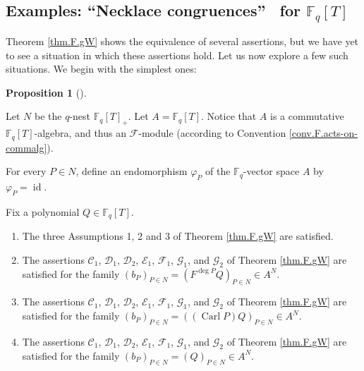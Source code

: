 \documentclass[numbers=enddot,12pt,final,onecolumn,notitlepage]{scrartcl}%
\theoremstyle{definition}
\newtheorem{prop}[theo]{Proposition}
\newenvironment{proposition}[1][]
{\begin{prop}[#1]\begin{leftbar}}
{\end{leftbar}\end{prop}}
\begin{document}
\subsection{Examples: \textquotedblleft Necklace congruences\textquotedblright%
\ for $\mathbb{F}_{q}\left[  T\right]  $}

Theorem \ref{thm.F.gW} shows the equivalence of several assertions, but we
have yet to see a situation in which these assertions hold. Let us now explore
a few such situations. We begin with the simplest ones:

\begin{proposition}
\label{prop.F.gW.example1}Let $N$ be the $q$-nest $\mathbb{F}_{q}\left[
T\right]  _{+}$. Let $A=\mathbb{F}_{q}\left[  T\right]  $. Notice that $A$ is
a commutative $\mathbb{F}_{q}\left[  T\right]  $-algebra, and thus an
$\mathcal{F}$-module (according to Convention \ref{conv.F.acts-on-commalg}).

For every $P\in N$, define an endomorphism $\varphi_{P}$ of the $\mathbb{F}%
_{q}$-vector space $A$ by $\varphi_{P}=\operatorname*{id}$.

Fix a polynomial $Q\in\mathbb{F}_{q}\left[  T\right]  $.

\begin{enumerate}
\item[\textbf{(a)}] The three Assumptions 1, 2 and 3 of Theorem \ref{thm.F.gW}
are satisfied.

\item[\textbf{(b)}] The assertions $\mathcal{C}_{1}$, $\mathcal{D}_{1}$,
$\mathcal{D}_{2}$, $\mathcal{E}_{1}$, $\mathcal{F}_{1}$, $\mathcal{G}_{1}$,
and $\mathcal{G}_{2}$ of Theorem \ref{thm.F.gW} are satisfied for the family
$\left(  b_{P}\right)  _{P\in N}=\left(  F^{\deg P}Q\right)  _{P\in N}\in
A^{N}$.

\item[\textbf{(c)}] The assertions $\mathcal{C}_{1}$, $\mathcal{D}_{1}$,
$\mathcal{D}_{2}$, $\mathcal{E}_{1}$, $\mathcal{F}_{1}$, $\mathcal{G}_{1}$,
and $\mathcal{G}_{2}$ of Theorem \ref{thm.F.gW} are satisfied for the family
$\left(  b_{P}\right)  _{P\in N}=\left(  \left(  \operatorname*{Carl}P\right)
Q\right)  _{P\in N}\in A^{N}$.

\item[\textbf{(d)}] The assertions $\mathcal{C}_{1}$, $\mathcal{D}_{1}$,
$\mathcal{D}_{2}$, $\mathcal{E}_{1}$, $\mathcal{F}_{1}$, $\mathcal{G}_{1}$,
and $\mathcal{G}_{2}$ of Theorem \ref{thm.F.gW} are satisfied for the family
$\left(  b_{P}\right)  _{P\in N}=\left(  Q\right)  _{P\in N}\in A^{N}$.
\end{enumerate}
\end{proposition}
\end{document}
